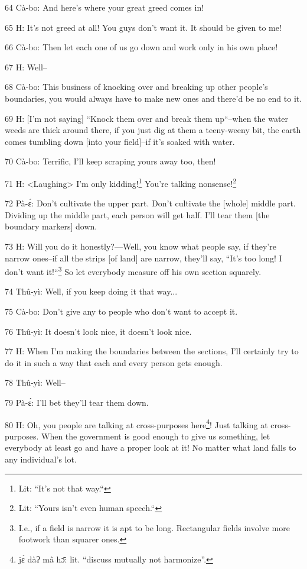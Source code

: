 64 Cà-bo: And here's where your great greed comes in!

65 H: It's not greed at all! You guys don't want it. It should be given to me!

66 Cà-bo: Then let each one of us go down and work only in his own place!

67 H: Well--

68 Cà-bo: This business of knocking over and breaking up other people's boundaries,
you would always have to make new ones and there'd be no end to it.

69 H: [I'm not saying] ``Knock them over and break them up``--when the
water weeds are thick around there, if you just dig at them a teeny-weeny bit,
the earth comes tumbling down [into your field]--if it's soaked with water.

70 Cà-bo: Terrific, I'll keep scraping yours away too, then!

71 H: <Laughing> I'm only kidding!\footnote{Lit: ``It's not that way.``} You're talking nonsense!\footnote{Lit: ``Yours isn't even human speech.``}

72 Pà-ɛ́: Don't cultivate the upper part. Don't cultivate the [whole] middle
part. Dividing up the middle part, each person will get half. I'll tear them [the
boundary markers] down.

73 H: Will you do it honestly?---Well, you know what people say, if they're narrow
ones--if all the strips [of land] are narrow, they'll say, ``It's too long!
I don't want it!``\footnote{I.e., if a field is narrow it is apt to be long. Rectangular fields involve more footwork than squarer ones.} So let everybody measure off his own section squarely.

74 Thû-yì: Well, if you keep doing it that way...

75 Cà-bo: Don't give any to people who don't want to accept it.

76 Thû-yì: It doesn't look nice, it doesn't look nice.

77 H: When I'm making the boundaries between the sections, I'll certainly try to
do it in such a way that each and every person gets enough.

78 Thû-yì: Well--

79 Pà-ɛ́: I'll bet they'll tear them down.

80 H: Oh, you people are talking at cross-purposes here\footnote{jɛ̀ dàʔ mâ hɔ̄: lit. ``discuss mutually not harmonize''.}! Just talking at cross-purposes.
When the government is good enough to give us something, let everybody at least
go and have a proper look at it! No matter what land falls to any individual's
lot.

